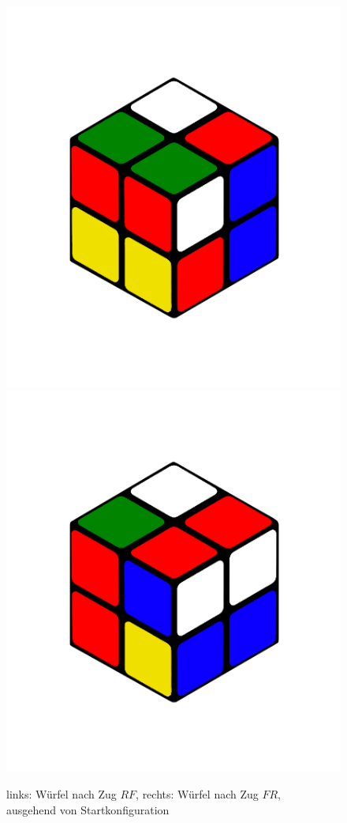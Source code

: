 \documentclass[12pt,a4paper, usenames, dvipsnames]{article}
\begin{document}
\begin{figure}[h]
\centering
\includegraphics[scale=0.1]{RF.png}
\includegraphics[scale=0.1]{FR.png}
\caption[Würfel nach Zügen $FR$ und $RF$]{links: Würfel nach Zug $RF$, rechts: Würfel nach Zug $FR$, \\ ausgehend von Startkonfiguration}
\end{figure} \ \\
\end{document}
